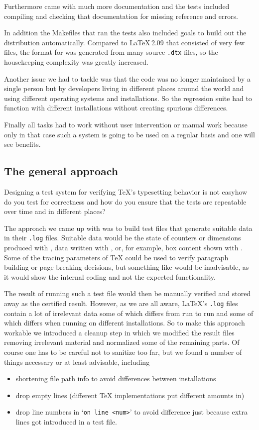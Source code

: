 \documentclass[a4paper]{ltugboat}
\begin{document}
Furthermore \LaTeXe{} came with much more documentation and the
tests included compiling and checking that documentation for missing
reference and errors.

In addition the Makefiles that ran the tests also included goals to
build out the distribution automatically.  Compared to \LaTeX\,2.09
that consisted of very few files, the format for \LaTeXe{} was
generated from many source \texttt{.dtx} files, so the housekeeping
complexity was greatly increased.

Another issue we had to tackle was that the code was no longer
maintained by a single person but by developers living in different
places around the world and using different operating systems and
installations. So the regression suite had to function with different
installations without creating spurious differences.

Finally all tasks had to work without user intervention or manual work because
only in that case such a system is going to be used on a regular basis
and one will see benefits.


\subsection{The general approach}

Designing a test system for verifying \TeX's typesetting behavior is
not easy\Dash how do you test for correctness and how do you ensure
that the tests are repeatable over time and in different places?

The approach we came up with was to build test files that generate
suitable data in their \texttt{.log} files. Suitable data would be
the state of counters or dimensions produced with , data
written with , or, for example, box content shown with
. Some of the tracing parameters of \TeX{} could be used to
verify paragraph building or page breaking decisions, but something
like  would be inadvisable, as it would show the
internal coding and not the expected functionality.

The result of running such a test file would then be manually verified
and stored away as the certified result. However, as we are all aware,
\LaTeX's \texttt{.log} files contain a lot of irrelevant data some of
which differs from run to run and some of which differs when running
on different installations. So to make this approach workable we
introduced a cleanup step in which we modified the result files
removing irrelevant material and normalized some of the remaining
parts. Of course one has to be careful not to sanitize too far, but we
found a number of things necessary or at least advisable, including
\begin{itemize}
\item  shortening file path info to avoid differences between
installations
\item drop empty lines (different \TeX{} implementations put
different amounts in)
\item drop line numbers in `\texttt{on line <num>}' to avoid difference
 just because extra lines got introduced in a test file.
\end{itemize}
\end{document}

